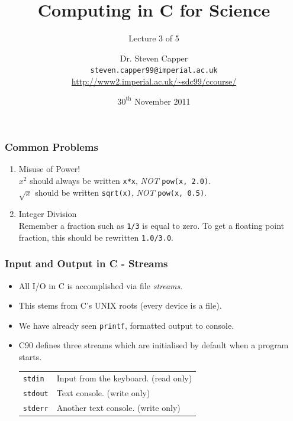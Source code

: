 \documentclass[table]{beamer}
\let\oldurl=\url
\renewcommand{\url}[1]{\textcolor{blue}{\oldurl{#1}}}
\begin{document}

\title[C for Science - Lecture 3]{Computing in C for Science}
\subtitle{Lecture 3 of 5}

\author[Steven Capper]{Dr. Steven Capper \\ {\tt steven.capper99@imperial.ac.uk}\\
\url{http://www2.imperial.ac.uk/~sdc99/ccourse/}}

\date{$30^\text{th}$ November 2011 }

\subject{C for Science} %
{
\begin{frame}
  \titlepage
\end{frame}
}

\begin{frame}
\frametitle{Common Problems}
\begin{enumerate}
\item Misuse of Power!\\
$x^2$ should always be written {\tt x*x}, \emph{NOT} {\tt pow(x, 2.0)}.\\
$\sqrt{x}$ should be written {\tt sqrt(x)}, \emph{NOT} {\tt pow(x, 0.5)}.
\item Integer Division\\
Remember a fraction such as {\tt 1/3} is equal to zero. To get a floating point fraction, this should be rewritten {\tt 1.0/3.0}.
\end{enumerate}
\end{frame}

\begin{frame}
\frametitle{Input and Output in C - Streams}
\begin{itemize}
\item All I/O in C is accomplished via file \emph{streams}.
\item This stems from C's UNIX roots (every device is a file).
\item We have already seen {\tt printf}, formatted output to console.
\item C90 defines three streams which are initialised by default when a program starts.
\begin{center}
\begin{tabular}{l l}
{\tt stdin}&Input from the keyboard. (read only)\\
{\tt stdout}&Text console. (write only)\\
{\tt stderr}&Another text console. (write only)
\end{tabular}
\end{center}
\end{itemize}
\end{frame}
\end{document}
